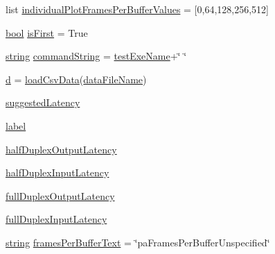 \begin{DoxyCompactItemize}
list \hyperlink{namespacepatest__suggested__vs__streaminfo__latency_ac671a6bf00bbe9c085d7e3aa05e33bb5}{individual\+Plot\+Frames\+Per\+Buffer\+Values} = \mbox{[}0,64,128,256,512\mbox{]}
\item 
\hyperlink{mac_2config_2i386_2lib-src_2libsoxr_2soxr-config_8h_abb452686968e48b67397da5f97445f5b}{bool} \hyperlink{namespacepatest__suggested__vs__streaminfo__latency_a8480c4acf54c3c5a9d64b0cea184042a}{is\+First} = True
\item 
\hyperlink{test__lib_f_l_a_c_2format_8c_ab02026ad0de9fb6c1b4233deb0a00c75}{string} \hyperlink{namespacepatest__suggested__vs__streaminfo__latency_a75b69c7e8804e6cd42178f6b16b8d24d}{command\+String} = \hyperlink{namespacepatest__suggested__vs__streaminfo__latency_a06a2ea4a2e1d432bfb9f16ff153f2370}{test\+Exe\+Name}+\char`\"{} \char`\"{}
\item 
\hyperlink{namespacepatest__suggested__vs__streaminfo__latency_a634e9acbff4c6d6af27377bf2146bf90}{d} = \hyperlink{namespacepatest__suggested__vs__streaminfo__latency_a7424dffa251f484c3101f5b560922137}{load\+Csv\+Data}(\hyperlink{namespacepatest__suggested__vs__streaminfo__latency_affbd9ac2873049fcdadb2cf2aad0949e}{data\+File\+Name})
\item 
\hyperlink{namespacepatest__suggested__vs__streaminfo__latency_ae87de80b3b414a82eb74a4d0472d0092}{suggested\+Latency}
\item 
\hyperlink{namespacepatest__suggested__vs__streaminfo__latency_aa0799fc0095e14a8957620a769574888}{label}
\item 
\hyperlink{namespacepatest__suggested__vs__streaminfo__latency_ac3375286fcd2d8da8a95235dd54aaef0}{half\+Duplex\+Output\+Latency}
\item 
\hyperlink{namespacepatest__suggested__vs__streaminfo__latency_a6cb05784b0b0903acdb89f8f69d98eec}{half\+Duplex\+Input\+Latency}
\item 
\hyperlink{namespacepatest__suggested__vs__streaminfo__latency_a59762e3491d5e8b2acca66b8288f52b9}{full\+Duplex\+Output\+Latency}
\item 
\hyperlink{namespacepatest__suggested__vs__streaminfo__latency_a326285d761c83012a72e8940344e788a}{full\+Duplex\+Input\+Latency}
\item 
\hyperlink{test__lib_f_l_a_c_2format_8c_ab02026ad0de9fb6c1b4233deb0a00c75}{string} \hyperlink{namespacepatest__suggested__vs__streaminfo__latency_a306ab567b84c29907e5f029ebd7358b0}{frames\+Per\+Buffer\+Text} = \char`\"{}pa\+Frames\+Per\+Buffer\+Unspecified\char`\"{}
\end{DoxyCompactItemize}


